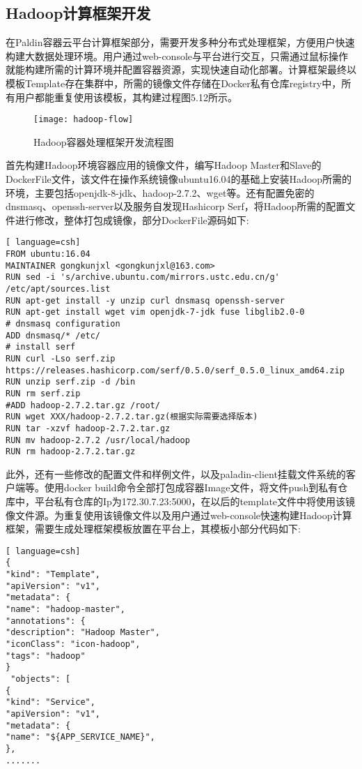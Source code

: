 \subsection{Hadoop计算框架开发}
在Paldin容器云平台计算框架部分，需要开发多种分布式处理框架，方便用户快速构建大数据处理环境。用户通过web-console与平台进行交互，只需通过鼠标操作就能构建所需的计算环境并配置容器资源，实现快速自动化部署。计算框架最终以模板Template存在集群中，所需的镜像文件存储在Docker私有仓库registry中，所有用户都能重复使用该模板，其构建过程图5.12所示。
\begin{figure}[H] %
	\centering
	\texttt{[image: hadoop-flow]}
	\caption{Hadoop容器处理框架开发流程图}
\end{figure}

首先构建Hadoop环境容器应用的镜像文件，编写Hadoop Master和Slave的DockerFile文件，该文件在操作系统镜像ubuntu16.04的基础上安装Hadoop所需的环境，主要包括openjdk-8-jdk、hadoop-2.7.2、wget等。还有配置免密的dnsmasq、openssh-server以及服务自发现Hashicorp Serf，将Hadoop所需的配置文件进行修改，整体打包成镜像，部分DockerFile源码如下:
\begin{lstlisting}[ language=csh]
FROM ubuntu:16.04
MAINTAINER gongkunjxl <gongkunjxl@163.com>
RUN sed -i 's/archive.ubuntu.com/mirrors.ustc.edu.cn/g' /etc/apt/sources.list
RUN apt-get install -y unzip curl dnsmasq openssh-server
RUN apt-get install wget vim openjdk-7-jdk fuse libglib2.0-0
# dnsmasq configuration
ADD dnsmasq/* /etc/
# install serf
RUN curl -Lso serf.zip https://releases.hashicorp.com/serf/0.5.0/serf_0.5.0_linux_amd64.zip
RUN unzip serf.zip -d /bin 
RUN rm serf.zip
#ADD hadoop-2.7.2.tar.gz /root/
RUN wget XXX/hadoop-2.7.2.tar.gz(根据实际需要选择版本)
RUN tar -xzvf hadoop-2.7.2.tar.gz
RUN mv hadoop-2.7.2 /usr/local/hadoop
RUN rm hadoop-2.7.2.tar.gz
\end{lstlisting}

此外，还有一些修改的配置文件和样例文件，以及paladin-client挂载文件系统的客户端等。使用docker build命令全部打包成容器Image文件，将文件push到私有仓库中，平台私有仓库的Ip为172.30.7.23:5000，在以后的template文件中将使用该镜像文件源。为重复使用该镜像文件以及用户通过web-console快速构建Hadoop计算框架，需要生成处理框架模板放置在平台上，其模板小部分代码如下:
\begin{lstlisting}[ language=csh]
{
"kind": "Template",
"apiVersion": "v1",
"metadata": {
"name": "hadoop-master",
"annotations": {
"description": "Hadoop Master",
"iconClass": "icon-hadoop",
"tags": "hadoop"
}
 "objects": [
{
"kind": "Service",
"apiVersion": "v1",
"metadata": {
"name": "${APP_SERVICE_NAME}",
},
.......
\end{lstlisting}


